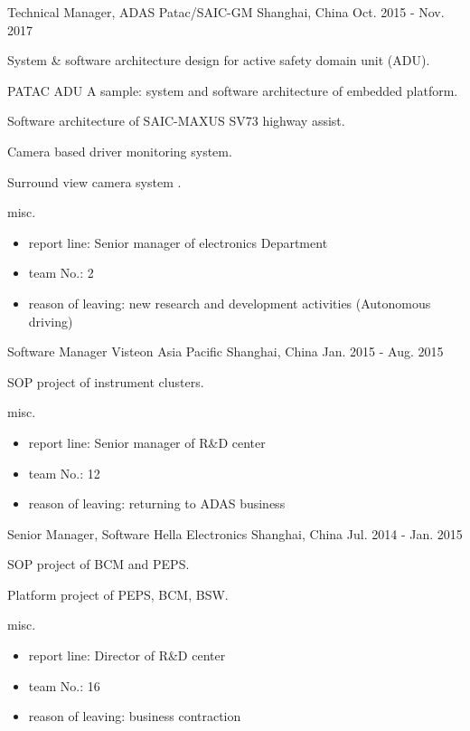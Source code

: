 \documentclass[../cv.tex]{subfiles}
\begin{document}
\begin{cventries}
	\cventry
	{Technical Manager, ADAS} %
	{Patac/SAIC-GM} %
	{Shanghai, China} %
	{Oct. 2015 - Nov. 2017} %
	{
		\begin{cvitems}
			\item System \& software architecture design for active safety domain unit (ADU).
			\item PATAC ADU A sample: system and software architecture of embedded platform.
			\item Software architecture of SAIC-MAXUS SV73 highway assist.
			\item Camera based driver monitoring system.
			\item Surround view camera system \supercite{Xin_RearView_17}.
			\item misc.
			\begin{itemize}
				\item report line: Senior manager of electronics Department
				\item team No.: 2
				\item reason of leaving: new research and development activities (Autonomous driving)
			\end{itemize}
		\end{cvitems}
	}


	\cventry
	{Software Manager} %
	{Visteon Asia Pacific} %
	{Shanghai, China} %
	{Jan. 2015 - Aug. 2015} %
	{
		\begin{cvitems}
			\item SOP project of instrument clusters.
			\item misc.
			\begin{itemize}
				\item report line: Senior manager of R\&D center
				\item team No.: 12
				\item reason of leaving: returning to ADAS business
			\end{itemize}
		\end{cvitems}
	}

	\cventry
	{Senior Manager, Software} %
	{Hella Electronics} %
	{Shanghai, China} %
	{Jul. 2014 - Jan. 2015} %
	{
		\begin{cvitems}
			\item SOP project of BCM and PEPS.
			\item Platform project of PEPS, BCM, BSW.
			\item misc.
			\begin{itemize}
				\item report line: Director of R\&D center
				\item team No.: 16
				\item reason of leaving: business contraction
			\end{itemize}
		\end{cvitems}
	}


\end{cventries}
\end{document}
